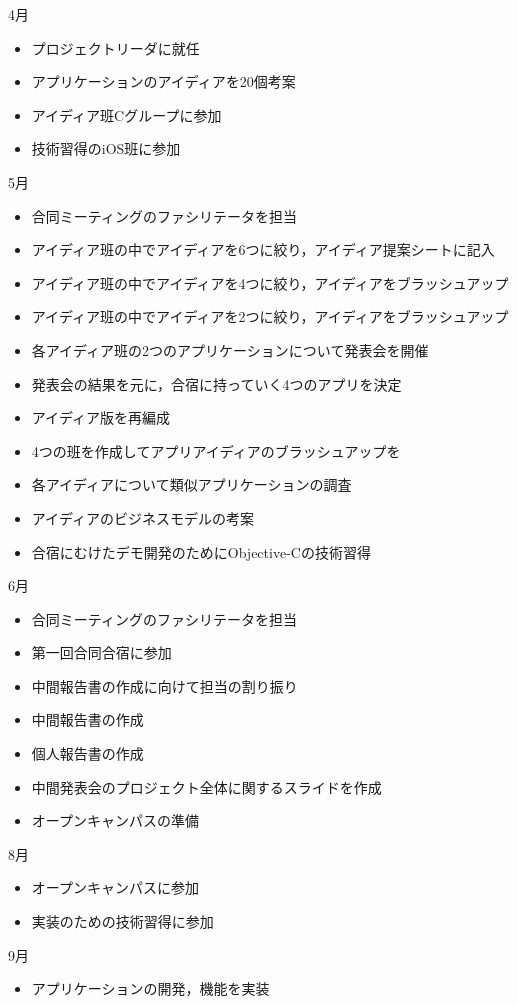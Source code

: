 4月
\begin{itemize}
\item プロジェクトリーダに就任
\item アプリケーションのアイディアを20個考案
\item アイディア班Cグループに参加
\item 技術習得のiOS班に参加
\end{itemize}
5月
\begin{itemize}
\item 合同ミーティングのファシリテータを担当
\item アイディア班の中でアイディアを6つに絞り，アイディア提案シートに記入
\item アイディア班の中でアイディアを4つに絞り，アイディアをブラッシュアップ
\item アイディア班の中でアイディアを2つに絞り，アイディアをブラッシュアップ
\item 各アイディア班の2つのアプリケーションについて発表会を開催
\item 発表会の結果を元に，合宿に持っていく4つのアプリを決定
\item アイディア版を再編成
\item 4つの班を作成してアプリアイディアのブラッシュアップを
\item 各アイディアについて類似アプリケーションの調査
\item アイディアのビジネスモデルの考案
\item 合宿にむけたデモ開発のためにObjective-Cの技術習得
\end{itemize}
6月
\begin{itemize}
\item 合同ミーティングのファシリテータを担当
\item 第一回合同合宿に参加
\item 中間報告書の作成に向けて担当の割り振り
\item 中間報告書の作成
\item 個人報告書の作成
\item 中間発表会のプロジェクト全体に関するスライドを作成
\item オープンキャンパスの準備
\end{itemize}
8月
\begin{itemize}
\item オープンキャンパスに参加
\item 実装のための技術習得に参加
\end{itemize}
9月
\begin{itemize}
\item アプリケーションの開発，機能を実装
\end{itemize}
